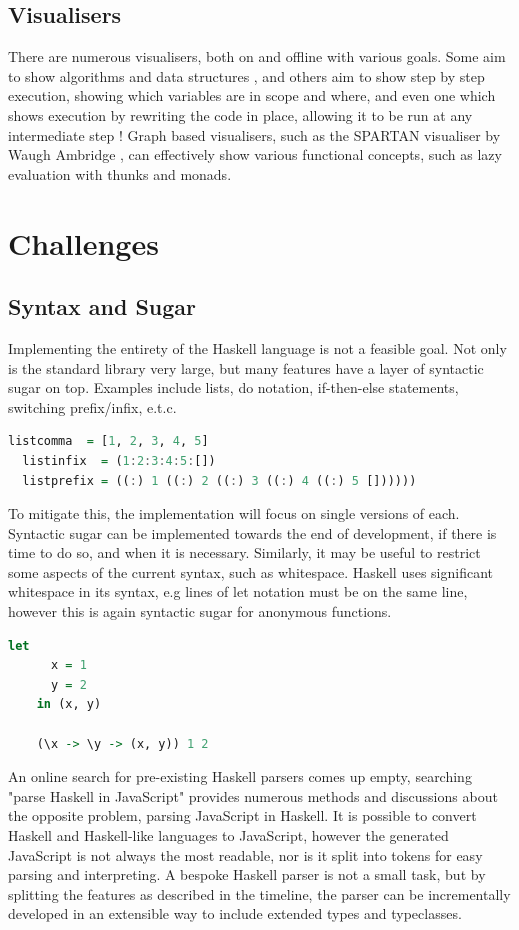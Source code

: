 \documentclass[a4paper]{article}
\begin{document}
\subsection{Visualisers}
There are numerous visualisers, both on and offline with various goals. Some aim to show algorithms and data structures \cite{algo-vis}, and others \cite{cscircles-vis} aim to show step by step execution, showing which variables are in scope and where, and even one which shows execution by rewriting the code in place, allowing it to be run at any intermediate step \cite{visualize-cbn}! Graph based visualisers, such as the SPARTAN visualiser by Waugh Ambridge \cite{SPARTAN}, can effectively show various functional concepts, such as lazy evaluation with thunks and monads.
\section{Challenges}
\subsection{Syntax and Sugar}
Implementing the entirety of the Haskell language is not a feasible goal. Not only is the standard library very large, but many features have a layer of syntactic sugar on top. Examples include lists, do notation, if-then-else statements, switching prefix/infix, e.t.c. 
\begin{lstlisting}[language=haskell, caption=Some of the ways to write a simple list.\cite{syntatic-sugar}]
  listcomma  = [1, 2, 3, 4, 5]
  listinfix  = (1:2:3:4:5:[])
  listprefix = ((:) 1 ((:) 2 ((:) 3 ((:) 4 ((:) 5 [])))))
\end{lstlisting}
To mitigate this, the implementation will focus on single versions of each. Syntactic sugar can be implemented towards the end of development, if there is time to do so, and when it is necessary.
Similarly, it may be useful to restrict some aspects of the current syntax, such as whitespace. Haskell uses significant whitespace in its syntax, e.g lines of let notation must be on the same line, however this is again syntactic sugar for anonymous functions.
\begin{lstlisting}[language=haskell, caption=let notation and the underlying meaning]
    let
      x = 1
      y = 2
    in (x, y)

    (\x -> \y -> (x, y)) 1 2
\end{lstlisting}
An online search for pre-existing Haskell parsers comes up empty, searching "parse Haskell in JavaScript" provides numerous methods and discussions about the opposite problem, parsing JavaScript in Haskell. It is possible to convert Haskell and Haskell-like languages to JavaScript, however the generated JavaScript is not always the most readable, nor is it split into tokens for easy parsing and interpreting.\cite{purescript} A bespoke Haskell parser is not a small task, but by splitting the features as described in the timeline, the parser can be incrementally developed in an extensible way to include extended types and typeclasses.
\end{document}

